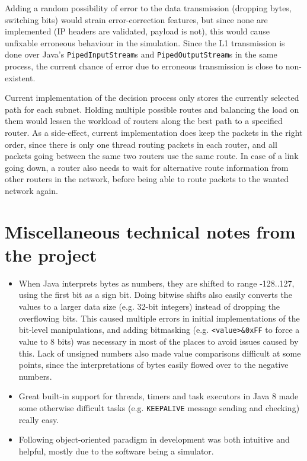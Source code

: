 \documentclass[11pt,a4paper,titlepage]{report}
\begin{document}
Adding a random possibility of error to the data transmission (dropping bytes, switching bits) would strain error-correction features, but since none are implemented (IP headers are validated, payload is not), this would cause unfixable erroneous behaviour in the simulation. Since the L1 transmission is done over Java's \texttt{PipedInputStream}s and \texttt{PipedOutputStream}s in the same process, the current chance of error due to erroneous transmission is close to non-existent.

Current implementation of the decision process only stores the currently selected path for each subnet. Holding multiple possible routes and balancing the load on them would lessen the workload of routers along the best path to a specified router. As a side-effect, current implementation does keep the packets in the right order, since there is only one thread routing packets in each router, and all packets going between the same two routers use the same route. In case of a link going down, a router also needs to wait for alternative route information from other routers in the network, before being able to route packets to the wanted network again.

\section{Miscellaneous technical notes from the project}\label{sec:notes}
\begin{itemize}
\item When Java interprets bytes as numbers, they are shifted to range -128..127, using the first bit as a sign bit. Doing bitwise shifts also easily converts the values to a larger data size (e.g. 32-bit integers) instead of dropping the overflowing bits. This caused multiple errors in initial implementations of the bit-level manipulations, and adding bitmasking (e.g. \texttt{<value>\&0xFF} to force a value to 8 bits) was necessary in most of the places to avoid issues caused by this. Lack of unsigned numbers also made value comparisons difficult at some points, since the interpretations of bytes easily flowed over to the negative numbers.
\item Great built-in support for threads, timers and task executors in Java 8 made some otherwise difficult tasks (e.g. \texttt{KEEPALIVE} message sending and checking) really easy.
\item Following object-oriented paradigm in development was both intuitive and helpful, mostly due to the software being a simulator.
\end{itemize}



\end{document}
